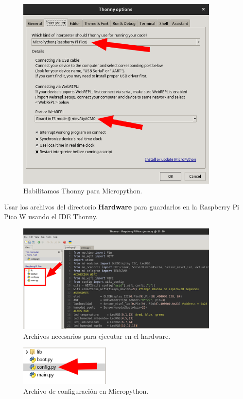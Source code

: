 \begin{figure}[h]
	\centering
	\includegraphics[width=0.9\textwidth]{img/desarrollo/thonny_seleccionInterpreter.png}
	\caption{Habilitamos Thonny para Micropython.}
\end{figure}

Usar los archivos del directorio \textbf{Hardware} para guardarlos en la Raspberry Pi Pico W usando el IDE Thonny.

\begin{figure}[h]
	\centering
	\includegraphics[width=0.9\textwidth]{img/desarrollo/thonny_archivosNecesarios.png}
	\caption{Archivos necesarios para ejecutar en el hardware.}
\end{figure}


\begin{figure}[h]
	\centering
	\includegraphics[width=0.4\textwidth]{img/desarrollo/thonny_config.png}
	\caption{Archivo de configuración en Micropython.}
\end{figure}

